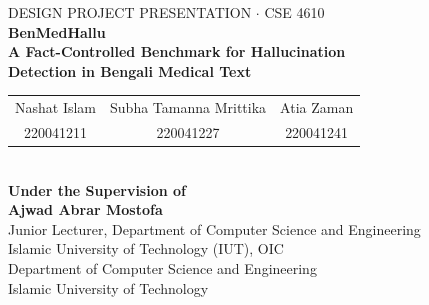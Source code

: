 \documentclass[aspectratio=169,11pt]{beamer}
\begin{document}
{
\begin{frame}[plain]
\vspace{4mm}
\begin{center}
{\scriptsize\color{soft}DESIGN PROJECT PRESENTATION \; $\cdot$ \; CSE 4610}\\[6mm]
{\LARGE\bfseries\color{iutblue} BenMedHallu}\\[2mm]
{\large\bfseries\color{iutblue} A Fact-Controlled Benchmark for Hallucination\\[1mm] Detection in Bengali Medical Text}\\[7mm]

\begin{tabular}{ccc}
\normalsize Nashat Islam & \normalsize Subha Tamanna Mrittika & \normalsize Atia Zaman\\
{\small\color{soft}220041211} & {\small\color{soft}220041227} & {\small\color{soft}220041241}
\end{tabular}\\[7mm]

{\small\bfseries Under the Supervision of}\\[2mm]
{\normalsize\bfseries Ajwad Abrar Mostofa}\\
{\small Junior Lecturer, Department of Computer Science and Engineering}\\
{\small Islamic University of Technology (IUT), OIC}\\[6mm]
{\small Department of Computer Science and Engineering\\Islamic University of Technology}
\end{center}
\end{frame}}
\end{document}
